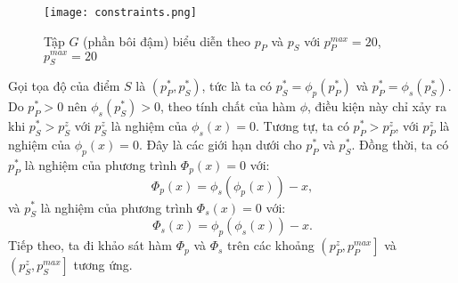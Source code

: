\documentclass[../main.tex]{subfiles}
\begin{document}
\begin{figure}
\centering
\texttt{[image: constraints.png]}
\caption{Tập $G$ (phần bôi đậm) biểu diễn theo $p_P$ và $p_S$ với $p_P^{max}=20$, $p_S^{max}=20$}
\label{fig:Constraints}
\end{figure}

Gọi tọa độ của điểm $S$ là $\left(p_P^*, p_S^*\right)$, tức là ta có $p_S^* = \phi_p\left(p_P^*\right)$ và $p_P^* = \phi_s\left(p_S^*\right)$. Do $p_P^* > 0$ nên $\phi_s\left(p_S^*\right) > 0$, theo tính chất của hàm $\phi$, điều kiện này chỉ xảy ra khi $p_S^* > p_S^z$ với $p_S^z$ là nghiệm của $\phi_s(x) = 0$. Tương tự, ta có $p_P^* > p_P^z$, với $p_P^z$ là nghiệm của $\phi_p(x) = 0$. Đây là các giới hạn dưới cho $p_P^*$ và $p_S^*$. Đồng thời, ta có $p_P^*$ là nghiệm của phương trình $\Phi_p\left(x\right) = 0$ với:
\begin{equation}\label{proofC:Phip}
\Phi_p\left(x\right) = \phi_s\left(\phi_p\left(x\right)\right) - x,
\end{equation}
và $p_S^*$ là nghiệm của phương trình $\Phi_s\left(x\right) = 0$ với:
\begin{equation}\label{proofC:Phis}
\Phi_s\left(x\right) = \phi_p\left(\phi_s\left(x\right)\right) - x.
\end{equation}
Tiếp theo, ta đi khảo sát hàm $\Phi_p$ và $\Phi_s$ trên các khoảng $\left(p_P^z, p_P^{max}\right]$ và $\left(p_S^z, p_S^{max}\right]$ tương ứng.
\end{document}
